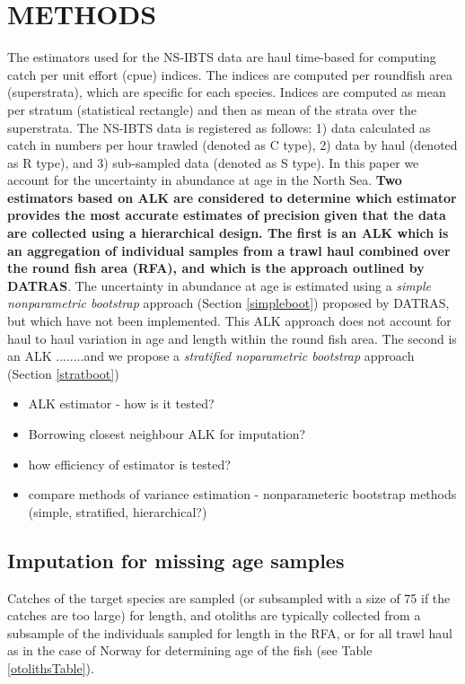\documentclass[a4paper 12pt]{article}
\numberwithin{equation}{section}
\begin{document}
\section{\large METHODS}
\label{methods}
The estimators used for the NS-IBTS data are haul time-based for computing catch per unit effort (cpue) indices. The indices are computed per roundfish area (superstrata), which are specific for each species. Indices are computed as mean per stratum (statistical rectangle) and then as mean of the strata  over the superstrata. The NS-IBTS data is registered as follows: 1) data calculated as catch in  numbers per hour trawled (denoted as C type), 2) data by haul (denoted as R type), and 3) sub-sampled data (denoted as S type). In this paper we account for the uncertainty in abundance at age in the North Sea. {\bf Two estimators based on ALK are considered to determine which estimator provides the most accurate estimates of precision given that the data are collected using a hierarchical design. The first is an ALK which is an aggregation of individual samples from a trawl haul combined over the round fish area (RFA), and which is the approach outlined by DATRAS}. The uncertainty in abundance at age is estimated using a \emph{simple nonparametric bootstrap} approach (Section \ref{simpleboot}) proposed by DATRAS, but which have not been implemented. This ALK approach does not account for haul to haul variation in age and length within the round fish area. The second is an ALK ........and we propose a \emph{stratified noparametric bootstrap} approach (Section \ref{stratboot})  \\

\begin{itemize}
\item ALK estimator - how is it tested?
\item Borrowing closest neighbour ALK for imputation? 
\item how efficiency of estimator is tested?
\item compare methods of variance estimation - nonparameteric bootstrap methods (simple, stratified, hierarchical?)
\end{itemize}


\subsection{Imputation for missing age samples}
Catches of the target species are sampled (or subsampled with a size of 75 if the catches are too large) for length, and otoliths are typically collected from a subsample of the individuals sampled for length in the RFA,  or for all trawl haul as in the case of Norway for determining age of the fish (see Table \ref{otolithsTable}). 
\end{document}
